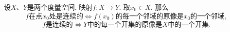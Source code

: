\begin{theorem}\label{theorem:度量空间.度量空间下的连续映射与邻域的联系}
设\(X\)、\(Y\)是两个度量空间.
映射\(f\colon X \to Y\).
取\(x_0 \in X\).
那么\[
\text{\(f\)在点\(x_0\)处是连续的}
\iff
\text{\(f(x_0)\)的每一个邻域的原像是\(x_0\)的一个邻域},
\]\[
\text{\(f\)是连续的}
\iff
\text{\(Y\)中的每一个开集的原像是\(X\)中的一个开集}.
\]
\end{theorem}


\begingroup
\def\T{\mathfrak T}%
\def\oT{\overline{\mathfrak T}}%
